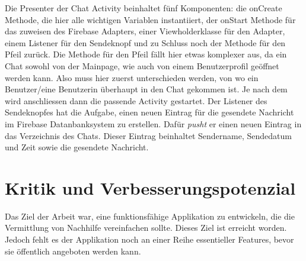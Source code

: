 \documentclass[a4paper,11pt]{report}
\begin{document}
				Die Presenter der Chat Activity beinhaltet fünf Komponenten: die onCreate Methode, die hier alle wichtigen Variablen instantiiert, der onStart Methode für das zuweisen des Firebase Adapters, einer Viewholderklasse für den Adapter, einem Listener für den Sendeknopf und zu Schluss noch der Methode für den Pfeil zurück. Die Methode für den Pfeil fällt hier etwas komplexer aus, da ein Chat sowohl von der Mainpage, wie auch von einem Benutzerprofil geöffnet werden kann. Also muss hier zuerst unterschieden werden, von wo ein Benutzer/eine Benutzerin überhaupt in den Chat gekommen ist. Je nach dem wird anschliessen dann die passende Activity gestartet. Der Listener des Sendeknopfes hat die Aufgabe, einen neuen Eintrag für die gesendete Nachricht im Firebase Datanbanksystem zu erstellen. Dafür \emph{pusht} er einen neuen Eintrag in das Verzeichnis des Chats. Dieser Eintrag beinhaltet Sendername, Sendedatum und Zeit sowie die gesendete Nachricht.
		
		\section{Kritik und Verbesserungspotenzial}
		Das Ziel der Arbeit war, eine funktionsfähige Applikation zu entwickeln, die die Vermittlung von Nachhilfe vereinfachen sollte. Dieses Ziel ist erreicht worden. Jedoch fehlt es der Applikation noch an einer Reihe  essentieller Features, bevor sie öffentlich angeboten werden kann.
		
\end{document}
